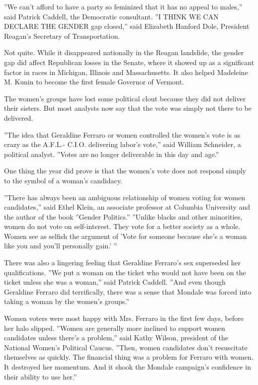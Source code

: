 ''We can't afford to have a party so feminized that it has no appeal to
males,'' said Patrick Caddell, the Democratic consultant. ''I THINK WE
CAN DECLARE THE GENDER gap closed,'' said Elizabeth Hanford Dole,
President Reagan's Secretary of Transportation.

Not quite. While it disappeared nationally in the Reagan landslide, the
gender gap did affect Republican losses in the Senate, where it showed
up as a significant factor in races in Michigan, Illinois and
Massachusetts. It also helped Madeleine M. Kunin to become the first
female Governor of Vermont.

The women's groups have lost some political clout because they did not
deliver their sisters. But most analysts now say that the vote was
simply not there to be delivered.

''The idea that Geraldine Ferraro or women controlled the women's vote
is as crazy as the A.F.L.- C.I.O. delivering labor's vote,'' said
William Schneider, a political analyst. ''Votes are no longer
deliverable in this day and age.''

One thing the year did prove is that the women's vote does not respond
simply to the symbol of a woman's candidacy.

''There has always been an ambiguous relationship of women voting for
women candidates,'' said Ethel Klein, an associate professor at Columbia
University and the author of the book ''Gender Politics.'' ''Unlike
blacks and other minorities, women do not vote on self-interest. They
vote for a better society as a whole. Women see as selfish the argument
of 'Vote for someone because she's a woman like you and you'll
personally gain.' ''

There was also a lingering feeling that Geraldine Ferraro's sex
superseded her qualifications. ''We put a woman on the ticket who would
not have been on the ticket unless she was a woman,'' said Patrick
Caddell. ''And even though Geraldine Ferraro did terrifically, there was
a sense that Mondale was forced into taking a woman by the women's
groups.''

Women voters were most happy with Mrs. Ferraro in the first few days,
before her halo slipped. ''Women are generally more inclined to support
women candidates unless there's a problem,'' said Kathy Wilson,
president of the National Women's Political Caucus. ''Then, women
candidates don't resuscitate themselves as quickly. The financial thing
was a problem for Ferraro with women. It destroyed her momentum. And it
shook the Mondale campaign's confidence in their ability to use her.''

